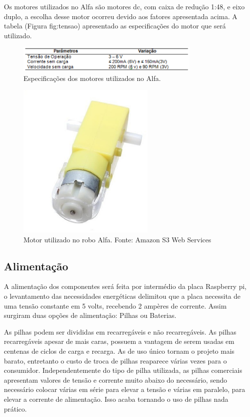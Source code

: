 Os motores utilizados no Alfa são motores dc, com caixa de redução 1:48, e eixo duplo, a escolha desse motor ocorreu devido aos
fatores apresentada acima. A tabela (Figura fig:tensao) apresentado as especificações do motor que será utilizado.

\begin{figure}[H]
    \centering
    \includegraphics[width=0.8\textwidth]{figuras/tensao.eps}
    \caption{Especificações dos motores utilizados no Alfa.}
    \label{fig:tensao}
\end{figure}

\begin{figure}[H]
    \centering
    \includegraphics[width=0.6\textwidth]{figuras/motor.eps}
    \caption{Motor utilizado no robo Alfa. Fonte: Amazon S3 Web Services}
    \label{fig:motor}
\end{figure}

\subsection{Alimentação}

A alimentação dos componentes será feita por intermédio da placa Raspberry pi, o levantamento das necessidades energéticas delimitou
que a placa necessita de uma tensão constante em 5 volts, recebendo 2 ampères de corrente.  Assim surgiram duas opções de
alimentação: Pilhas ou Baterias.

As pilhas podem ser divididas em recarregáveis e não recarregáveis. As pilhas recarregáveis apesar de mais caras, possuem a vantagem de
serem usadas em centenas de ciclos de carga e recarga. As de uso único tornam o projeto mais barato, entretanto o custo de troca de
pilhas reaparece várias vezes para o consumidor. Independentemente do tipo de pilha utilizada, as pilhas comerciais apresentam valores
de tensão e corrente muito abaixo do necessário, sendo necessário colocar várias em série para elevar a tensão e várias em paralelo,
para elevar a corrente de alimentação. Isso acaba tornando o uso de pilhas nada prático.

